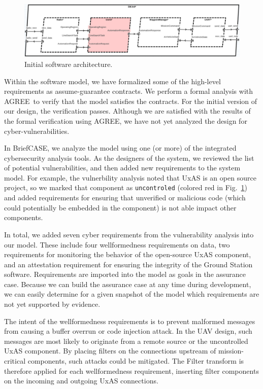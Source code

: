 \documentclass[global,twocolumn]{svjour}
\newcommand{\figref}[1]{Fig.~\ref{#1}}
\newcommand{\brfcs}{BriefCASE}
\newcommand{\agr}{AGREE}
\begin{document}
\begin{figure}[h]
	\centering
	\includegraphics[width=2\columnwidth]{figs/sw-initial.PNG}
	\caption{Initial software architecture.}
	\label{fig:sw-initial}
\end{figure}

Within the software model, we have formalized some of the high-level requirements as assume-guarantee contracts.
%
We perform a formal analysis with \agr\ to verify that the model satisfies the contracts.
%
For the initial version of our design, the verification passes.
%
Although we are satisfied with the results of the formal verification using AGREE, we have not yet analyzed the design for cyber-vulnerabilities.

In \brfcs, we analyze the model using one (or more) of the integrated cybersecurity analysis tools.
%
As the designers of the system, we reviewed the list of potential vulnerabilities, and then added new requirements to the system model.
%
For example, the vulnerbility analysis noted that UxAS is an open source project, so we marked that component as \texttt{uncontroled} (colored red in \figref{fig:sw-initial}) and added requirements for ensuring that unverified or malicious code (which could potentially be embedded in the component) is not able impact other components.

In total, we added seven cyber requirements from the vulnerability analysis into our model.
%
These include four wellformedness requirements on data, two requirements for monitoring the behavior of the open-source UxAS component, and an attestation requirement for ensuring the integrity of the Ground Station software.
%
Requirements are imported into the model as goals in the assurance case.
%
Because we can build the assurance case at any time during development, we can easily determine for a given snapshot of the model which requirements are not yet supported by evidence.

The intent of the wellformedness requirements is to prevent malformed messages from causing a buffer overrun or code injection attack.
%
In the UAV design, such messages are most likely to originate from a remote source or the uncontrolled UxAS component.
%
By placing filters on the connections upstream of mission-critical components, such attacks could be mitigated.
%
The Filter transform is therefore applied for each wellformedness requirement, inserting filter components on the incoming and outgoing UxAS connections.
\end{document}
